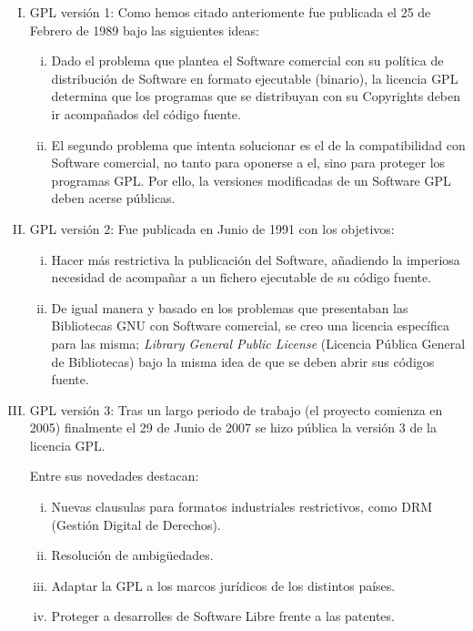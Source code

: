 \begin{enumerate}[I.]
\item GPL versión 1: Como hemos citado anteriomente fue publicada el 25 de
Febrero de 1989 bajo las siguientes ideas:

\begin{enumerate}[i.]
\item Dado el problema que plantea el Software comercial con su política de
distribución de Software en formato ejecutable (binario), la licencia GPL
determina que los programas que se distribuyan con su Copyrights deben ir
acompañados del código fuente.

\item El segundo problema que intenta solucionar es el de la compatibilidad con
Software comercial, no tanto para oponerse a el, sino para proteger los
programas GPL. Por ello, la versiones modificadas de un Software GPL deben
acerse públicas. 
\end{enumerate}

\item GPL versión 2: Fue publicada en Junio de 1991 con los objetivos:

\begin{enumerate}[i.]
\item Hacer más restrictiva la publicación del Software, añadiendo la imperiosa
necesidad de acompañar a un fichero ejecutable de su código fuente.
 

\item De igual manera y basado en los problemas que presentaban las Bibliotecas
GNU con Software comercial, se creo una licencia específica para las misma;
\textit{Library
General Public License} (Licencia Pública General de Bibliotecas) bajo la misma
idea de que se deben abrir sus códigos fuente. 
\end{enumerate}

\item GPL versión 3: Tras un largo periodo de trabajo (el proyecto comienza en
2005) finalmente el 29 de Junio de 2007 se hizo pública la versión 3 de la
licencia GPL.

Entre sus novedades destacan:

\begin{enumerate}[i.]

\item Nuevas clausulas para formatos industriales restrictivos, como DRM
(Gestión Digital de Derechos).

\item Resolución de ambigüedades.

\item Adaptar la GPL a los marcos jurídicos de los distintos países.

\item Proteger a desarrolles de Software Libre frente a las patentes. 

\end{enumerate}

\end{enumerate}